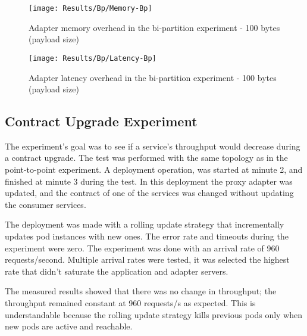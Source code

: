 \begin{figure}[htbp]
    \centering
    \centerline{\texttt{[image: Results/Bp/Memory-Bp]}}
    \caption{Adapter memory overhead in the bi-partition experiment - 100 bytes (payload size)}
    \label{fig:biPartMem}
\end{figure}

\begin{figure}[htbp]
    \centering
    \centerline{\texttt{[image: Results/Bp/Latency-Bp]}}
    \caption{Adapter latency overhead in the bi-partition experiment - 100 bytes (payload size)}
    \label{fig:biPartLatency}
\end{figure}

\newpage

\subsection{Contract Upgrade Experiment}

The experiment's goal was to see if a service's throughput would decrease during a contract upgrade.
The test was performed with the same topology as in the point-to-point experiment.
A deployment operation, was started at minute 2, and finished at minute 3 during the test.
In this deployment the proxy adapter was updated, and the contract of one of the services was changed without updating the consumer services.

The deployment was made with a rolling update strategy that incrementally updates pod instances with new ones.
The error rate and timeouts during the experiment were zero.
The experiment was done with an arrival rate of 960 requests/second.
Multiple arrival rates were tested, it was selected the highest rate that didn't saturate the application and adapter servers.

The measured results showed that there was no change in throughput; the throughput remained constant at 960 requests/s as expected.
This is understandable because the rolling update strategy kills previous pods only when new pods are active and reachable.